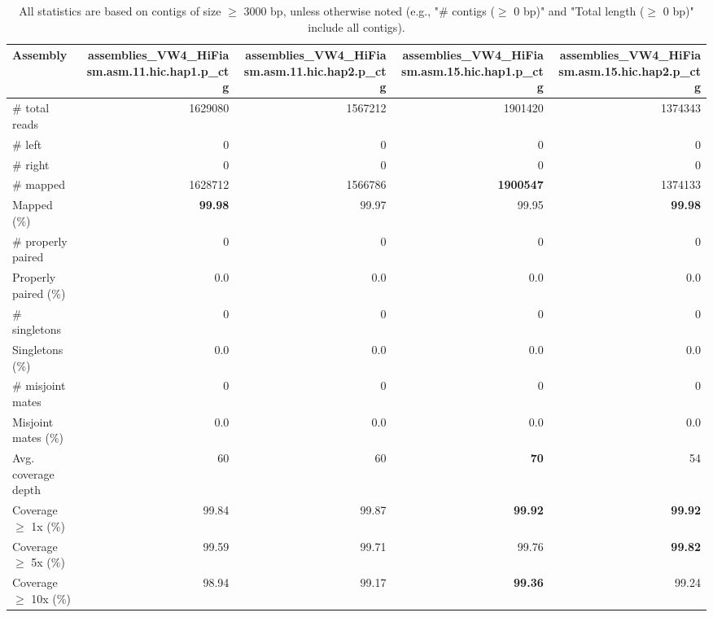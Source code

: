 \documentclass[12pt,a4paper]{article}
\begin{document}
\begin{table}[ht]
\begin{center}
\caption{All statistics are based on contigs of size $\geq$ 3000 bp, unless otherwise noted (e.g., "\# contigs ($\geq$ 0 bp)" and "Total length ($\geq$ 0 bp)" include all contigs).}
\begin{tabular}{|l*{4}{|r}|}
\hline
Assembly & assemblies\_VW4\_HiFiasm.asm.11.hic.hap1.p\_ctg & assemblies\_VW4\_HiFiasm.asm.11.hic.hap2.p\_ctg & assemblies\_VW4\_HiFiasm.asm.15.hic.hap1.p\_ctg & assemblies\_VW4\_HiFiasm.asm.15.hic.hap2.p\_ctg \\ \hline
\# total reads & 1629080 & 1567212 & 1901420 & 1374343 \\ \hline
\# left & 0 & 0 & 0 & 0 \\ \hline
\# right & 0 & 0 & 0 & 0 \\ \hline
\# mapped & 1628712 & 1566786 & {\bf 1900547} & 1374133 \\ \hline
Mapped (\%) & {\bf 99.98} & 99.97 & 99.95 & {\bf 99.98} \\ \hline
\# properly paired & 0 & 0 & 0 & 0 \\ \hline
Properly paired (\%) & 0.0 & 0.0 & 0.0 & 0.0 \\ \hline
\# singletons & 0 & 0 & 0 & 0 \\ \hline
Singletons (\%) & 0.0 & 0.0 & 0.0 & 0.0 \\ \hline
\# misjoint mates & 0 & 0 & 0 & 0 \\ \hline
Misjoint mates (\%) & 0.0 & 0.0 & 0.0 & 0.0 \\ \hline
Avg. coverage depth & 60 & 60 & {\bf 70} & 54 \\ \hline
Coverage $\geq$ 1x (\%) & 99.84 & 99.87 & {\bf 99.92} & {\bf 99.92} \\ \hline
Coverage $\geq$ 5x (\%) & 99.59 & 99.71 & 99.76 & {\bf 99.82} \\ \hline
Coverage $\geq$ 10x (\%) & 98.94 & 99.17 & {\bf 99.36} & 99.24 \\ \hline
\end{tabular}
\end{center}
\end{table}
\end{document}
